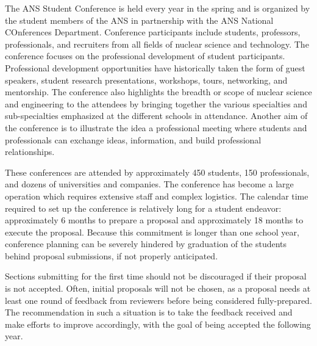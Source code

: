 \documentclass[12pt]{article}
\begin{document}
The ANS Student Conference is held every year in the spring and is organized  by the student members of the ANS in partnership with the ANS National COnferences Department. Conference participants include students, professors, professionals, and recruiters from all fields of nuclear science and technology. The conference focuses on the professional development of student participants. Professional development opportunities have historically taken the form of guest speakers, student research presentations, workshops, tours, networking, and mentorship. The conference also highlights the breadth or scope of nuclear science and engineering to the attendees by bringing together the various specialties and sub-specialties emphasized at the different schools in attendance. Another aim of the conference is to illustrate the idea a professional meeting where students and professionals can exchange ideas, information, and build professional relationships.

These conferences are attended by approximately 450 students, 150 professionals, and dozens of universities and companies. The conference has become a large operation which requires extensive staff and complex logistics. The calendar time required to set up the conference is relatively long for a student endeavor: approximately 6 months to prepare a proposal and approximately 18 months to execute the proposal. Because this commitment is longer than one school year, conference planning can be severely hindered by graduation of the students behind proposal submissions, if not properly anticipated.

Sections submitting for the first time should not be discouraged if their proposal is not accepted. Often, initial proposals will not be chosen, as a proposal needs at least one round of feedback from reviewers before being considered fully-prepared. The recommendation in such a situation is to take the feedback received and make efforts to improve accordingly, with the goal of being accepted the following year.
\end{document}
